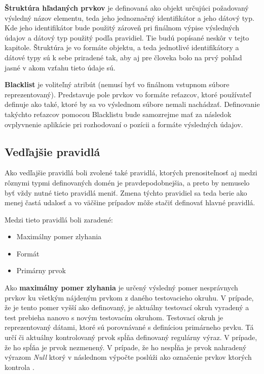 \newpage

\textbf{Štruktúra hľadaných prvkov} je definovaná ako objekt určujúci požadovaný výsledný názov elementu, teda jeho jednoznačný identifikátor a jeho  dátový typ. Kde jeho identifikátor bude použitý zároveň pri finálnom výpise výsledných údajov a dátový typ použitý podľa pravidiel. Tie budú popísané neskôr v tejto kapitole. Štruktúra je vo formáte objektu, a teda jednotlivé identifikátory a dátové typy sú k sebe priradené tak, aby aj pre človeka bolo na prvý pohľad jasné v akom vzťahu tieto údaje sú.

\bigskip

\textbf{Blacklist} je voliteľný atribút (nemusí byť vo finálnom vstupnom súbore reprezentovaný). Predstavuje pole prvkov vo formáte reťazcov, ktoré používateľ definuje ako také, ktoré by sa vo výslednom súbore nemali nachádzať. Definovanie takýchto reťazcov pomocou Blacklistu bude samozrejme mať za následok ovplyvnenie aplikácie pri rozhodovaní o pozícii a formáte výsledných údajov. 


\subsection{Vedľajšie pravidlá}

Ako vedľajšie pravidlá boli zvolené také pravidlá, ktorých prenositeľnosť aj medzi rôznymi typmi definovaných domén je pravdepodobnejšia, a preto by nemuselo byť vždy nutné tieto pravidlá meniť. Zmena týchto pravidiel sa teda berie ako menej častá udalosť a vo väčšine prípadov môže stačiť definovať hlavné pravidlá. 

Medzi tieto pravidlá boli zaradené:
\begin{itemize}
    \item {Maximálny pomer zlyhania}
    \item {Formát}
    \item {Primárny prvok}
\end{itemize}

\bigskip

Ako \textbf{maximálny pomer zlyhania} je určený výsledný pomer nesprávnych prvkov ku všetkým nájdeným prvkom z daného testovacieho okruhu. V prípade, že je tento pomer vyšší ako definovaný, je aktuálny testovací okruh vyradený a test prebieha nanovo s novým testovacím okruhom. Testovací okruh je reprezentovaný dátami, ktoré sú porovnávané s definíciou primárneho prvku. Tá určí či aktuálny kontrolovaný prvok spĺňa definovaný regulárny výraz. V prípade, že ho spĺňa je prvok nezmenený. V prípade, že ho nespĺňa je prvok nahradený výrazom \textit{Null} ktorý v následnom výpočte poslúži ako označenie prvkov ktorých kontrola . 

